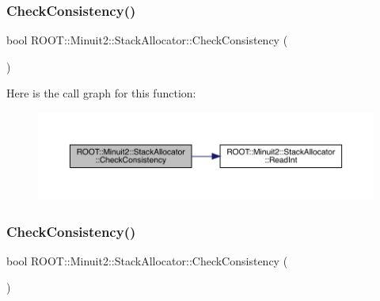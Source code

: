 \subsubsection{\texorpdfstring{CheckConsistency()}{CheckConsistency()}\hspace{0.1cm}{\footnotesize\ttfamily [2/3]}}
{\footnotesize\ttfamily bool R\+O\+O\+T\+::\+Minuit2\+::\+Stack\+Allocator\+::\+Check\+Consistency (\begin{DoxyParamCaption}{ }\end{DoxyParamCaption})\hspace{0.3cm}{\ttfamily [inline]}}

Here is the call graph for this function\+:
\nopagebreak
\begin{figure}[H]
\begin{center}
\leavevmode
\includegraphics[width=350pt]{d3/d1e/classROOT_1_1Minuit2_1_1StackAllocator_ad1189cdc76a07c36ef1924ad2488797d_cgraph}
\end{center}
\end{figure}
\mbox{\label{classROOT_1_1Minuit2_1_1StackAllocator_ad1189cdc76a07c36ef1924ad2488797d}} 
\subsubsection{\texorpdfstring{CheckConsistency()}{CheckConsistency()}\hspace{0.1cm}{\footnotesize\ttfamily [3/3]}}
{\footnotesize\ttfamily bool R\+O\+O\+T\+::\+Minuit2\+::\+Stack\+Allocator\+::\+Check\+Consistency (\begin{DoxyParamCaption}{ }\end{DoxyParamCaption})\hspace{0.3cm}{\ttfamily [inline]}}

